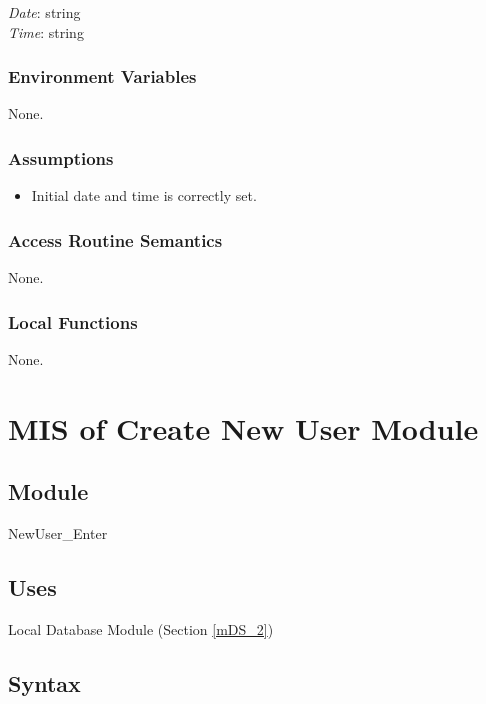 \documentclass[12pt, titlepage]{article}
\begin{document}
\textit{Date}: string\\
\textit{Time}: string\\

\subsubsection{Environment Variables}

None.

\subsubsection{Assumptions}

\begin{itemize}
\item Initial date and time is correctly set.
\end{itemize}

\subsubsection{Access Routine Semantics}

None.

\subsubsection{Local Functions}

None.
\newpage



\section{MIS of Create New User Module} \label{mPS} 

\subsection{Module}

NewUser\_Enter

\subsection{Uses}

Local Database Module (Section \ref{mDS_2})

\subsection{Syntax}
\end{document}
